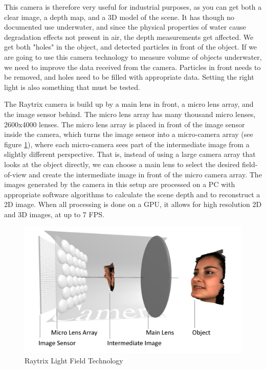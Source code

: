 This camera is therefore very useful for industrial purposes, as you can get both a clear image, a depth map, and a 3D model of the scene. It has though no documented use underwater, and since the physical properties of water cause degradation effects not present in air, the depth measurements get affected. We get both "holes" in the object, and detected particles in front of the object. If we are going to use this camera technology to measure volume of objects underwater, we need to improve the data received from the camera. Particles in front needs to be removed, and holes need to be filled with appropriate data. Setting the right light is also something that must be tested. 

The Raytrix camera is build up by a main lens in front, a micro lens array, and the image sensor behind. The micro lens array has many thousand micro lenses, 2600x4000 lenses. The micro lens array is placed in front of the image sensor inside the camera, which turns the image sensor into a micro-camera array (see figure \ref{fig:light_field}), where each micro-camera sees part of the intermediate image from a slightly different perspective. That is, instead of using a large camera array that looks at the object directly, we can choose a main lens to select the desired field-of-view and create the intermediate image in front of the micro camera array. The images generated by the camera in this setup are processed on a PC with appropriate software algorithms to calculate the scene depth and to reconstruct a 2D image. When all processing is done on a GPU, it allows for high resolution 2D and 3D images, at up to 7 FPS. \cite{website:raytrix_technology}

\begin{figure}[h]
    \centering
    \includegraphics[width=.9\linewidth]{images/introduction/Light-Field-Camera-Schematic}
    \caption{Raytrix Light Field Technology}
    \label{fig:light_field}
\end{figure}

